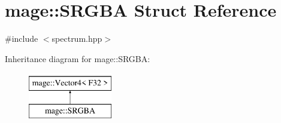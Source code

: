 \hypertarget{structmage_1_1_s_r_g_b_a}{}\section{mage\+:\+:S\+R\+G\+BA Struct Reference}
\label{structmage_1_1_s_r_g_b_a}


{\ttfamily \#include $<$spectrum.\+hpp$>$}

Inheritance diagram for mage\+:\+:S\+R\+G\+BA\+:\begin{figure}[H]
\begin{center}
\leavevmode
\includegraphics[height=2.000000cm]{structmage_1_1_s_r_g_b_a}
\end{center}
\end{figure}
